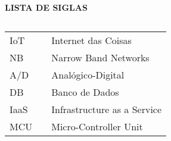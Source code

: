 \newpage

\begin{center}
\textbf{LISTA DE SIGLAS}
\end{center}
$\!$\\

\begin{tabular}{lll}
IoT & \hspace{1cm} & Internet das Coisas \\
NB &\hspace{1cm} &  Narrow Band Networks \\
A/D & \hspace{1cm} & Analógico-Digital \\
DB &  \hspace{1cm} & Banco de Dados \\
IaaS & \hspace{1cm} & Infrastructure as a Service \\
MCU & \hspace{1cm} & Micro-Controller Unit \\
\end{tabular}

